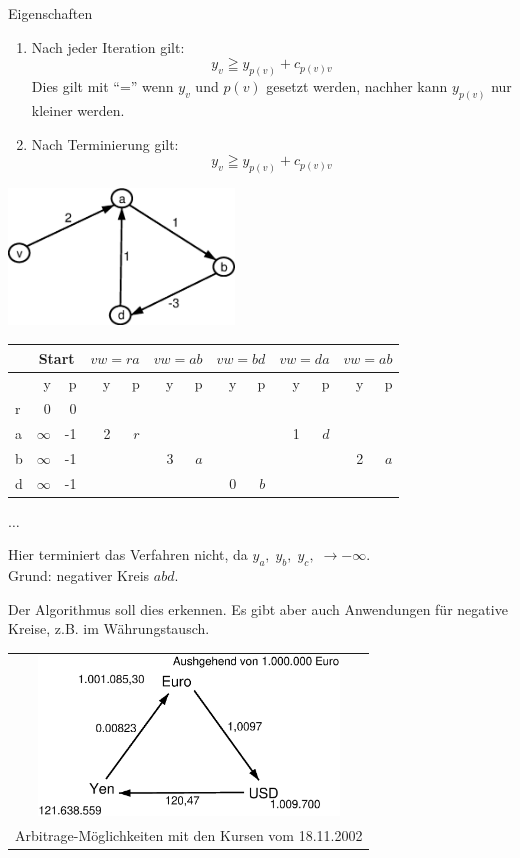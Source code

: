Eigenschaften
\begin{enumerate}
\item Nach jeder Iteration gilt:
\[y_{v} \geqq y_{p(v)} + c_{p(v)v}\]
Dies gilt mit "`="' wenn $y_{v}$ und $p(v)$ gesetzt werden, nachher kann
$y_{p(v)}$ nur kleiner werden.
\item Nach Terminierung gilt:
\[y_{v} \geqq y_{p(v)} + c_{p(v)v}\]
\end{enumerate}

\includegraphics[width=6cm]{bilder/2-2FordBsp2}

\begin{tabular}[c]{l|r|r|r|r|r|r|r|r|r|r|r|r}
&\multicolumn{2}{|c|}{Start}&\multicolumn{2}{|c|}{$v w=r a$}&
\multicolumn{2}{|c|}{$v w=ab$}&\multicolumn{2}{|c|}{$v w=b d$}&
\multicolumn{2}{|c|}{$v w=da$}&\multicolumn{2}{|c}{$v w=ab$}\\ \hline
&y&p&\hspace{2mm}$\;$y&p&\hspace{2mm}$\;$y&p&\hspace{2mm}$\;$y&p&
\hspace{2mm}$\;$y&p&\hspace{2mm}$\;$y&p\\ \hline
r&0&0&&&&&&&&&&\\
a&$\infty$&-1&2&$r$&&&&&1&$d$&&\\
b&$\infty$&-1&&&3&$a$&&&&&2&$a$\\
d&$\infty$&-1&&&&&0&$b$&&&&
\end{tabular} $\ldots$

Hier terminiert das Verfahren nicht, da $y_{a}, \; y_{b}, \; y_{c}, \;
\rightarrow - \infty$.\\
Grund: negativer Kreis $a b d$.

Der Algorithmus soll dies erkennen. Es gibt aber auch Anwendungen für
negative Kreise, z.B. im Währungstausch.

\begin{tabular}{c}
\includegraphics[width=8cm]{bilder/2-2Arbitrage}\\
Arbitrage-Möglichkeiten mit den Kursen vom 18.11.2002
\end{tabular}

